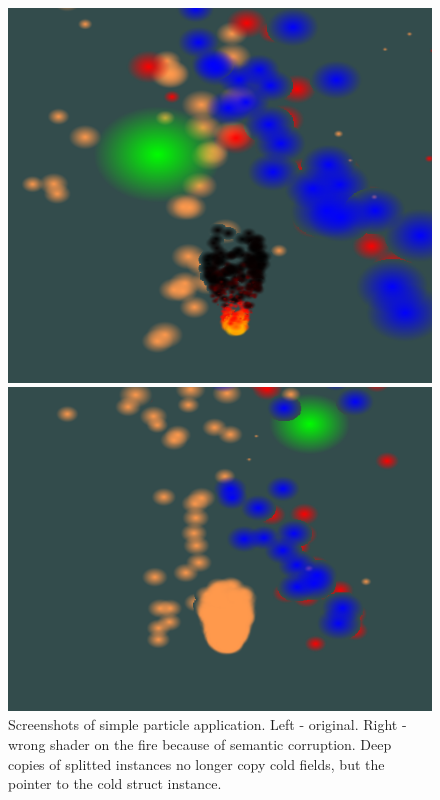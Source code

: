 \begin{figure}[ht]
	\begin{minipage}[b]{0.5\linewidth}
		\centering
		\includegraphics[width=\textwidth,height=.7\textwidth]{PICs/particles}
	\end{minipage}
	\hspace{0.5cm}
	\begin{minipage}[b]{0.5\linewidth}
		\centering
		\includegraphics[width=\textwidth,height=.7\textwidth]{PICs/particles_faulty}
	\end{minipage}
\caption{Screenshots of simple particle application. Left - original. Right - wrong shader on the fire because of semantic corruption. Deep copies of splitted instances no longer copy cold fields, but the pointer to the cold struct instance.}\label{particles_faulty}
\end{figure}
